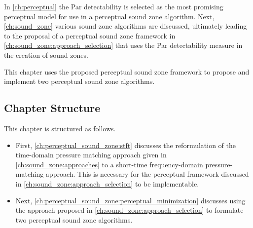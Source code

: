 In \autoref{ch:perceptual} the Par detectability is selected as the most promising perceptual model for use in a perceptual sound zone algorithm.
Next, \autoref{ch:sound_zone} various sound zone algorithms are discussed, ultimately leading to the proposal of a perceptual sound zone framework in \autoref{ch:sound_zone:approach_selection} that uses the Par detectability measure in the creation of sound zones.

This chapter uses the proposed perceptual sound zone framework to propose and implement two perceptual sound zone algorithms.

\subsection*{Chapter Structure}
This chapter is structured as follows.
\begin{itemize}
    \item First, \autoref{ch:perceptual_sound_zone:stft} discusses the reformulation of the time-domain pressure matching approach given in \autoref{ch:sound_zone:approaches} to a short-time frequency-domain pressure-matching approach.
    This is necessary for the perceptual framework discussed in \autoref{ch:sound_zone:approach_selection} to be implementable.
    \item Next, \autoref{ch:perceptual_sound_zone:perceptual_minimization} discusses using the approach proposed in \autoref{ch:sound_zone:approach_selection} to formulate two perceptual sound zone algorithms.
\end{itemize}
